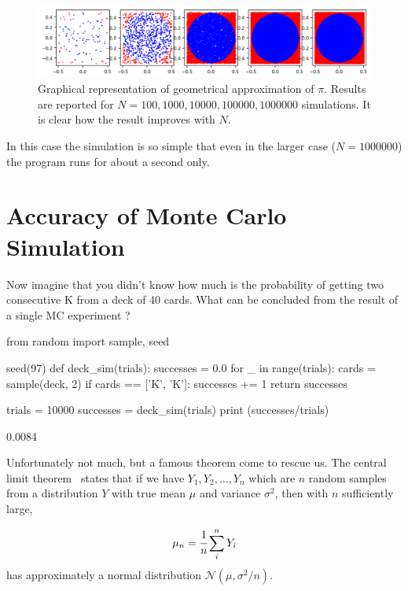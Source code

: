 \begin{figure}[htb]
\centering
\includegraphics[width=1\textwidth]{figures/mc_vs_n_experiments}
\caption{Graphical representation of geometrical approximation of $\pi$. Results are reported for $N = 100, 1000, 10000, 100000, 1000000$ simulations. It is clear how the result improves with $N$.}
\label{fig:circle_approx}
\end{figure}

In this case the simulation is so simple that even in the larger case ($N=1000000$) the program runs for about a second only.

\section{Accuracy of Monte Carlo Simulation}
\label{sec:confidence_interval}

Now imagine that you didn't know how much is the probability of getting two consecutive K from a deck of 40 cards. What can be concluded from the result of a single MC experiment ?
    
\begin{ipython}
from random import sample, seed

seed(97)
def deck_sim(trials):
    successes = 0.0
    for _ in range(trials):
        cards = sample(deck, 2)
        if cards == ['K', 'K']:
            successes += 1
    return successes

trials = 10000
successes = deck_sim(trials)
print (successes/trials)
   \end{ipython}
\begin{ioutput}
0.0084
\end{ioutput}

Unfortunately not much, but a famous theorem come to rescue us.
The central limit theorem~\cite{bib:central_limit} states that if we have \(Y_1, Y_2,\dots, Y_n\) which are $n$ random samples from a distribution \(Y\) with true mean \(\mu\) and variance \(\sigma^{2}\), then with \(n\) sufficiently large,

\begin{equation*} 
\mu_n = \cfrac{1}{n}\sum_i^n Y_i
\end{equation*}
has approximately a normal distribution \(\mathcal{N}(\mu, \sigma^2/n)\).

